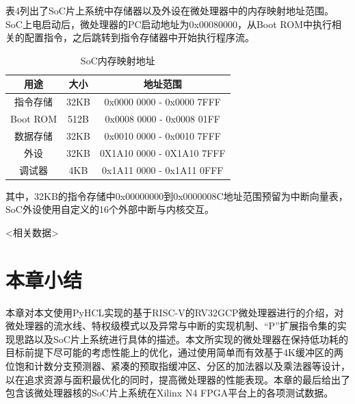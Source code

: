 表4列出了SoC片上系统中存储器以及外设在微处理器中的内存映射地址范围。SoC上电启动后，微处理器的PC启动地址为0x00080000，从Boot ROM中执行相关的配置指令，之后跳转到指令存储器中开始执行程序流。

\begin{table}
	\caption{SoC内存映射地址}
	\centering
	\small 
	\begin{tabular}{ccc}
		\hline 
		用途 & 大小                & 地址范围             \tabularnewline
		\hline 
		指令存储   & 32KB		     & 0x0000 0000 - 0x0000 7FFF \tabularnewline
		Boot ROM   & 512B		     & 0x0008 0000 - 0x0008 01FF \tabularnewline
		数据存储   & 32KB		     & 0x0010 0000 - 0x0010 7FFF \tabularnewline
		外设   & 32KB		     & 0X1A10 0000 - 0X1A10 7FFF \tabularnewline
		调试器   & 4KB		     & 0x1A11 0000 - 0x1A11 0FFF \tabularnewline
		\hline 
	\end{tabular}
\end{table}

其中，32KB的指令存储中0x00000000到0x0000008C地址范围预留为中断向量表，SoC外设使用自定义的16个外部中断与内核交互。

<相关数据>

\section{本章小结}

本章对本文使用PyHCL实现的基于RISC-V的RV32GCP微处理器进行的介绍，对微处理器的流水线、特权级模式以及异常与中断的实现机制、“P”扩展指令集的实现思路以及SoC片上系统进行具体的描述。本文所实现的微处理器在保持低功耗的目标前提下尽可能的考虑性能上的优化，通过使用简单而有效基于4K缓冲区的两位饱和计数分支预测器、紧凑的预取指缓冲区、分区的加法器以及乘法器等设计，以在追求资源与面积最优化的同时，提高微处理器的性能表现。本章的最后给出了包含该微处理器核的SoC片上系统在Xilinx N4 FPGA平台上的各项测试数据。